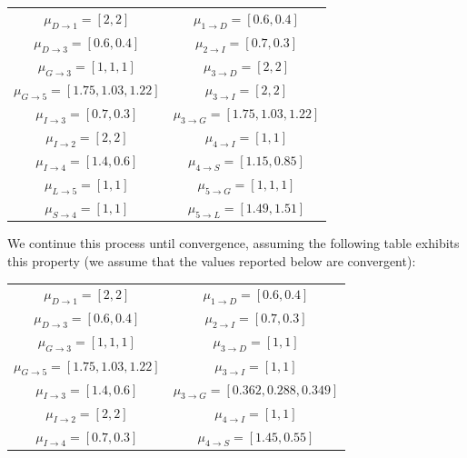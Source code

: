 \begin{example}
\begin{itemize}
    \end{itemize}
    \begin{table}[H]
        \centering
        \begin{tabular}{|cc|}
        \hline
        $\mu_{D \rightarrow 1}=[2,2]$ & $\mu_{1 \rightarrow D}=[0.6,0.4]$   \\
        $\mu_{D \rightarrow 3}=[0.6,0.4]$ & $\mu_{2 \rightarrow I}=[0.7,0.3]$   \\
        $\mu_{G \rightarrow 3}=[1,1,1]$ & $\mu_{3 \rightarrow D}=[2,2]$   \\
        $\mu_{G \rightarrow 5}=[1.75,1.03,1.22]$ & $\mu_{3 \rightarrow I}=[2,2]$   \\
        $\mu_{I \rightarrow 3}=[0.7,0.3]$ & $\mu_{3 \rightarrow G}=[1.75,1.03,1.22]$ \\
        $\mu_{I \rightarrow 2}=[2,2]$ & $\mu_{4 \rightarrow I}=[1,1]$   \\
        $\mu_{I \rightarrow 4}=[1.4,0.6]$ & $\mu_{4 \rightarrow S}=[1.15,0.85]$   \\
        $\mu_{L \rightarrow 5}=[1,1]$ & $\mu_{5 \rightarrow G}=[1,1,1]$ \\
        $\mu_{S \rightarrow 4}=[1,1]$ & $\mu_{5 \rightarrow L}=[1.49,1.51]$   \\ \hline
        \end{tabular}
    \end{table}
    We continue this process until convergence, assuming the following table exhibits this property (we assume that the values reported below are convergent):
    \begin{table}[H]
        \centering
        \begin{tabular}{|cc|}
        \hline
        $\mu_{D \rightarrow 1}=[2,2]$ & $\mu_{1 \rightarrow D}=[0.6,0.4]$   \\
        $\mu_{D \rightarrow 3}=[0.6,0.4]$ & $\mu_{2 \rightarrow I}=[0.7,0.3]$   \\
        $\mu_{G \rightarrow 3}=[1,1,1]$ & $\mu_{3 \rightarrow D}=[1,1]$   \\
        $\mu_{G \rightarrow 5}=[1.75,1.03,1.22]$ & $\mu_{3 \rightarrow I}=[1,1]$   \\
        $\mu_{I \rightarrow 3}=[1.4,0.6]$ & $\mu_{3 \rightarrow G}=[0.362,0.288,0.349]$ \\
        $\mu_{I \rightarrow 2}=[2,2]$ & $\mu_{4 \rightarrow I}=[1,1]$   \\
        $\mu_{I \rightarrow 4}=[0.7,0.3]$ & $\mu_{4 \rightarrow S}=[1.45,0.55]$   \\

\end{tabular}
\end{table}
\end{example}
